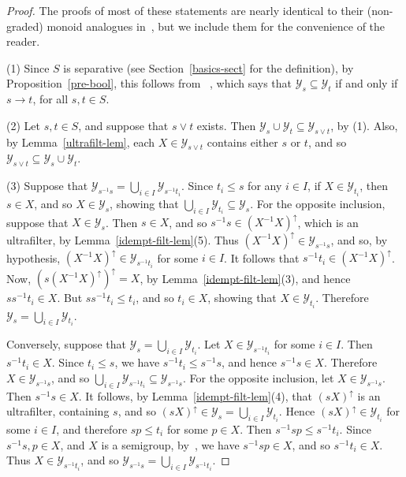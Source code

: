 \documentclass[a4paper,reqno,12pt]{amsart}
\numberwithin{equation}{section}
\theoremstyle{plain}
\theoremstyle{definition}
\begin{document}
\begin{proof}
The proofs of most of these statements are nearly identical to their (non-graded) monoid analogues in~\cite[Lemma 2.21]{Lawson2}, but we include them for the convenience of the reader.

\smallskip

(1) Since $S$ is separative (see Section~\ref{basics-sect} for the definition), by Proposition~\ref{pre-bool}, this follows from~ \cite[Lemma 2.11(1)]{Lawson3}, which says that  $\mathcal{Y}_s \subseteq \mathcal{Y}_t$ if and only if $s \to t$, for all $s,t \in S$.

\smallskip

(2) Let $s,t \in S$, and suppose that $s \lor t$ exists. Then $\mathcal{Y}_s \cup \mathcal{Y}_t \subseteq \mathcal{Y}_{s\lor t}$, by (1). Also, by Lemma~\ref{ultrafilt-lem}, each $X \in \mathcal{Y}_{s\lor t}$ contains either $s$ or $t$, and so $\mathcal{Y}_{s\lor t} \subseteq \mathcal{Y}_s \cup \mathcal{Y}_t$.

\smallskip

(3) Suppose that $\mathcal{Y}_{s^{-1}s} = \bigcup_{i\in I} \mathcal{Y}_{s^{-1}t_i}$. Since $t_i \leq s$ for any $i \in I$, if $X \in \mathcal{Y}_{t_i}$, then $s \in X$, and so $X \in \mathcal{Y}_{s}$, showing that $\bigcup_{i\in I} \mathcal{Y}_{t_i} \subseteq \mathcal{Y}_{s}$. For the opposite inclusion, suppose that $X \in \mathcal{Y}_{s}$. Then $s \in X$, and so $s^{-1}s \in (X^{-1}X)^{\uparrow}$, which is an ultrafilter, by Lemma~\ref{idempt-filt-lem}(5). Thus $(X^{-1}X)^{\uparrow} \in \mathcal{Y}_{s^{-1}s}$, and so, by hypothesis, $(X^{-1}X)^{\uparrow} \in \mathcal{Y}_{s^{-1}t_i}$ for some $i \in I$. It follows that $s^{-1}t_i \in (X^{-1}X)^{\uparrow}$. Now, $(s(X^{-1}X)^{\uparrow})^{\uparrow} = X$, by Lemma~\ref{idempt-filt-lem}(3), and hence $ss^{-1}t_i \in X$. But $ss^{-1}t_i \leq t_i$, and so $t_i \in X$, showing that $X \in \mathcal{Y}_{t_i}$. Therefore $\mathcal{Y}_{s} = \bigcup_{i\in I} \mathcal{Y}_{t_i}$.

Conversely, suppose that $\mathcal{Y}_{s} = \bigcup_{i\in I} \mathcal{Y}_{t_i}$. Let $X \in \mathcal{Y}_{s^{-1}t_i}$ for some $i \in I$. Then $s^{-1}t_i \in X$. Since $t_i \leq s$, we have $s^{-1}t_i \leq s^{-1}s$, and hence $s^{-1}s \in X$. Therefore $X \in \mathcal{Y}_{s^{-1}s}$, and so $\bigcup_{i\in I} \mathcal{Y}_{s^{-1}t_i} \subseteq \mathcal{Y}_{s^{-1}s}$. For the opposite inclusion, let $X \in \mathcal{Y}_{s^{-1}s}$. Then $s^{-1}s \in X$. It follows, by Lemma~\ref{idempt-filt-lem}(4), that $(sX)^{\uparrow}$ is an ultrafilter, containing $s$, and so $(sX)^{\uparrow}\in \mathcal{Y}_{s} = \bigcup_{i\in I} \mathcal{Y}_{t_i}$. Hence $(sX)^{\uparrow}\in \mathcal{Y}_{t_i}$ for some $i \in I$, and therefore $sp \leq t_i$ for some $p\in X$. Then $s^{-1}sp \leq s^{-1}t_i$. Since $s^{-1}s, p \in X$, and $X$ is a semigroup, by~\cite[Lemma 2.8(2)]{Lawson3}, we have $s^{-1}sp \in X$, and so $s^{-1}t_i \in X$. Thus $X \in \mathcal{Y}_{s^{-1}t_i}$, and so $\mathcal{Y}_{s^{-1}s} = \bigcup_{i\in I} \mathcal{Y}_{s^{-1}t_i}$.


\end{proof}
\end{document}
